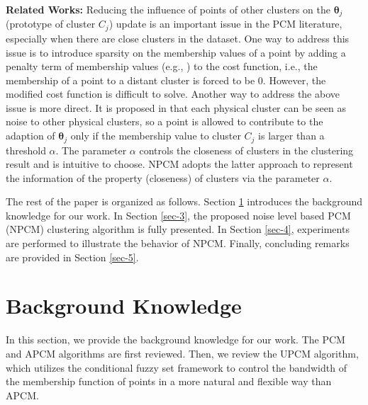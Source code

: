 \documentclass[journal]{IEEEtran}
\theoremstyle{definition}
\begin{document}
\textbf{Related Works:}
Reducing the influence of points of other clusters on the $\boldsymbol{\theta}_j$ (prototype of cluster $C_j$) update is an important issue in the PCM literature, especially when there are close clusters in the dataset. One way to address this issue is to introduce sparsity on the membership values of a point by adding a penalty term of membership values (e.g., \cite{inokuchi_sparse_2007}\cite{xenaki_sparsity-aware_2016}) to the cost function, i.e., the membership of a point to a distant cluster is forced to be $0$. However, the modified cost function is difficult to solve. Another way to address the above issue is more direct. It is proposed in \cite{hou_pcm_2016} that each physical cluster can be seen as noise to other physical clusters, so a point is allowed to contribute to the adaption of $\boldsymbol{\theta}_j$ only if the membership value to cluster $C_j$ is larger than a threshold $\alpha$. The parameter $\alpha$ controls the closeness of clusters in the clustering result and is intuitive to choose. NPCM adopts the latter approach to represent the information of the property (closeness) of clusters via the parameter $\alpha$.

The rest of the paper is organized as follows. Section \ref{sec-2} introduces the background knowledge for our work. In Section \ref{sec-3}, the proposed noise level based PCM (NPCM) clustering algorithm is fully presented. In Section \ref{sec-4}, experiments are performed to illustrate the behavior of NPCM. Finally, concluding remarks are provided in Section \ref{sec-5}.
\section{Background Knowledge}
\label{sec-2}
In this section, we provide the background knowledge for our work. The PCM and APCM algorithms are first reviewed. Then, we review the UPCM algorithm, which utilizes the conditional fuzzy set framework to control the bandwidth of the membership function of points in a more natural and flexible way than APCM.
\end{document}
